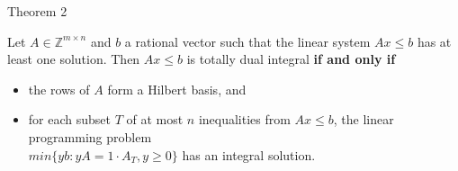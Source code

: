 \documentclass{beamer}
\begin{document}

\begin{frame}

	\begin{block}{Theorem 2}

		Let $A\in \mathbb{Z}^{m \times n}$ and $b$ a rational vector such that the linear system $Ax \leq b$ has at least one solution. Then $Ax \leq b$ is totally dual integral \textbf{if and only if}\\

		\begin{itemize}

			\item the rows of $A$ form a Hilbert basis, and

			\item for each subset $T$ of at most $n$ inequalities from $Ax\leq b$, the linear programming problem \\
			$min\{yb: yA=1\cdot A_T, y\geq 0 \}$ has an integral solution.

		\end{itemize}

	\end{block}

\end{frame}
\end{document}

